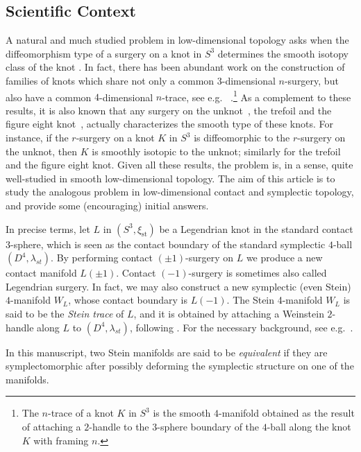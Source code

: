 \documentclass[11pt]{amsart} %
\newcommand{\xist}{\xi_{\mathrm{st}}}
\theoremstyle{plain}
\theoremstyle{definition}
\begin{document}
\subsection{Scientific Context} A natural and much studied problem in low-dimensional topology asks when the diffeomorphism type of a surgery on a knot in $S^3$ determines the smooth isotopy class of the knot \cite{Brakes80,KirbyList,Osoinach06}. In fact, there has been abundant work on the construction of families of knots which share not only a common $3$-dimensional $n$-surgery, but also have a common $4$-dimensional $n$-trace, see e.g.~ \cite{AbeJongLueckeOsoinach15, AbeJongOmaeTakeuchi13, MillerPiccirillo18, Piccirillo19}.\footnote{The $n$-trace of a knot $K$ in $ S^3$ is the smooth $4$-manifold obtained as the result of attaching a $2$-handle to the $3$-sphere boundary of the $4$-ball along the knot $K$ with framing $n$.} As a complement to these results, it is also known that any surgery on the unknot~\cite{KronheimerMrowkaOzsvathSzabo07}, the trefoil and the figure eight knot~\cite{OzsvathSzabo19}, actually characterizes the smooth type of these knots. For instance, if the $r$-surgery on a knot $K$ in $S^3$ is diffeomorphic to the $r$-surgery on the unknot, then $K$ is smoothly isotopic to the unknot; similarly for the trefoil and the figure eight knot. Given all these results, the problem is, in a sense, quite well-studied in smooth low-dimensional topology. The aim of this article is to study the analogous problem in low-dimensional contact and symplectic topology, and provide some (encouraging) initial answers.

In precise terms, let $L$ in $ (S^3,\xist)$ be a Legendrian knot in the standard contact $3$-sphere, which is seen as the contact boundary of the standard symplectic $4$-ball $(D^4,\lambda_{st})$. By performing contact $(\pm 1)$-surgery on $L$  we produce a new contact manifold $L(\pm 1)$. Contact $(-1)$-surgery is sometimes also called Legendrian surgery. In fact, we may also construct a new symplectic (even Stein) $4$-manifold $W_L$, whose contact boundary is $L(-1)$. The Stein 4-manifold $W_L$ is said to be the \textit{Stein trace} of $L$, and it is obtained by attaching a Weinstein $2$-handle along $L$ to $(D^4,\lambda_{st})$, following \cite[Section 3]{Weinstein91}. For the necessary background, see e.g.~\cite{ArnoldGivental01,Geiges08,Weinstein91}. 

In this manuscript, two Stein manifolds are said to be \textit{equivalent} if they are symplectomorphic after possibly deforming the symplectic structure on one of the manifolds. 
\end{document}
